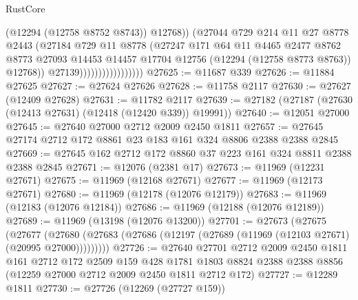 \begin{lexlean}{RustCore}
\begin{coremodule}
                                        (@12294 (@12758 @8752 @8743))
                                        @12768))
                                    (@27044
                                      @729
                                      @214
                                      @11
                                      @27
                                      @8778
                                      @2443
                                      (@27184
                                        @729
                                        @11
                                        @8778
                                        (@27247
                                          @171
                                          @64
                                          @11
                                          @4465
                                          @2477
                                          @8762
                                          @8773
                                          @27093
                                          @14453
                                          @14457
                                          @17704
                                          @12756
                                          (@12294 (@12758 @8773 @8763))
                                          @12768))
                                      @27139)))))))))))))))))
@27625 := @11687 @339
@27626 := @11884 @27625
@27627 := @27624 @27626
@27628 := @11758 @2117
@27630 := @27627 (@12409 @27628)
@27631 := @11782 @2117
@27639 := @27182 (@27187 (@27630 (@12413 @27631) (@12418 (@12420 @339)) @19991))
@27640 := @12051 @27000
@27645 := @27640 @27000 @2712 @2009 @2450 @1811
@27657 := @27645 @27174 @2712 @172 @8861 @23 @183 @161 @324 @8806 @2388 @2388 @2845
@27669 := @27645 @162 @2712 @172 @8860 @37 @223 @161 @324 @8811 @2388 @2388 @2845
@27671 := @12076 (@2381 @17)
@27673 := @11969 (@12231 @27671)
@27675 := @11969 (@12168 @27671)
@27677 := @11969 (@12173 @27671)
@27680 := @11969 (@12178 (@12076 @12179))
@27683 := @11969 (@12183 (@12076 @12184))
@27686 := @11969 (@12188 (@12076 @12189))
@27689 := @11969 (@13198 (@12076 @13200))
@27701 := @27673
    (@27675
      (@27677
        (@27680 (@27683 (@27686 (@12197 (@27689 (@11969 (@12103 @27671) (@20995 @27000)))))))))
@27726 := @27640
    @27701
    @2712
    @2009
    @2450
    @1811
    @161
    @2712
    @172
    @2509
    @159
    @428
    @1781
    @1803
    @8824
    @2388
    @2388
    @8856
    (@12259 @27000 @2712 @2009 @2450 @1811 @2712 @172)
@27727 := @12289 @1811
@27730 := @27726 (@12269 (@27727 @159))

\end{coremodule}
\end{lexlean}
